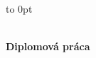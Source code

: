 \makeatletter
\begin{titlepage}
    \begin{center}
        \MakeUppercase{\textbf{\university}}\\
        \MakeUppercase{\textbf{\faculty}}
    \end{center}
    
    \vbox to 0pt{
        \vspace{4em}
        \textbf{\uid}
        \vss 
    }
    
    \vspace*{\fill}
    \begin{center}
        \textbf{\large \@title\\}
        \vspace{1em}
        \textbf{Diplomová práca}
    \end{center}
    \vspace*{\fill}
    \textbf{\the\year\\\@author}
    
\end{titlepage}
\makeatother